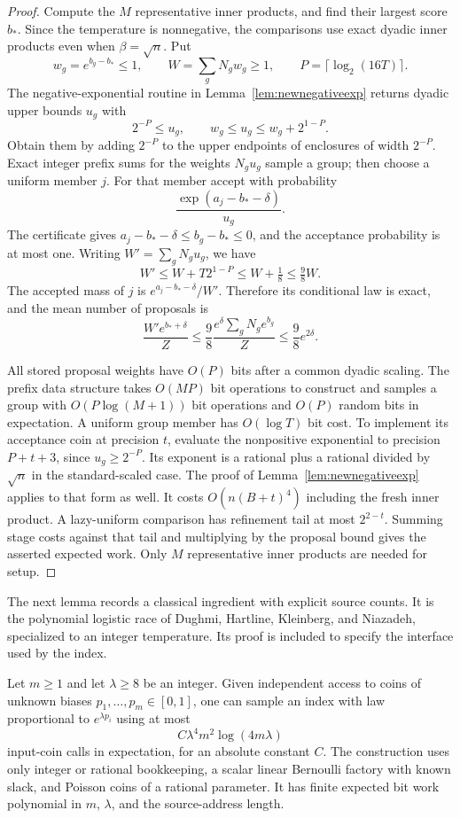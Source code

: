 \begin{proof}
Compute the $M$ representative inner products, and find their
largest score $b_*$. Since the temperature is nonnegative, the
comparisons use exact dyadic inner products even when
$\beta=\sqrt n$. Put
\[
 w_g=e^{b_g-b_*}\le1,\qquad W=\sum_gN_gw_g\ge1,
 \qquad P=\lceil\log_2(16T)\rceil.
\]
The negative-exponential routine in
Lemma~\ref{lem:newnegativeexp} returns dyadic upper bounds $u_g$
with
\[
 2^{-P}\le u_g,\qquad w_g\le u_g\le w_g+2^{1-P}.
\]
Obtain them by adding $2^{-P}$ to the upper endpoints of enclosures
of width $2^{-P}$. Exact integer prefix sums for the weights
$N_gu_g$ sample a group; then choose a uniform member $j$.
For that member accept with probability
\[
 \frac{\exp(a_j-b_*-\delta)}{u_g}.
\]
The certificate gives $a_j-b_*-\delta\le b_g-b_*\le0$, and
the acceptance probability is at most one. Writing
$W'=\sum_gN_gu_g$, we have
\[
 W'\le W+T2^{1-P}\le W+\tfrac18\le\tfrac98W.
\]
The accepted mass of $j$ is $e^{a_j-b_*-\delta}/W'$. Therefore
its conditional law is exact, and the mean number of proposals is
\[
 \frac{W'e^{b_*+\delta}}{Z}
 \le\frac98\frac{e^\delta\sum_gN_ge^{b_g}}Z
 \le\frac98e^{2\delta}.
\]

All stored proposal weights have $O(P)$ bits after a common dyadic
scaling. The prefix data structure takes $O(MP)$ bit operations to
construct and samples a group with $O(P\log(M+1))$ bit operations
and $O(P)$ random bits in expectation. A uniform group member has
$O(\log T)$ bit cost. To implement its acceptance coin at precision
$t$, evaluate the nonpositive exponential to precision $P+t+3$,
since $u_g\ge2^{-P}$. Its exponent is a rational plus a rational
divided by $\sqrt n$ in the standard-scaled case. The proof of
Lemma~\ref{lem:newnegativeexp} applies to that form as well.
It costs $O(n(B+t)^4)$ including the fresh inner product.
A lazy-uniform comparison has refinement tail at most $2^{2-t}$.
Summing stage costs against that tail and multiplying by the
proposal bound gives the asserted expected work. Only
$M$ representative inner products are needed for setup.
\end{proof}

The next lemma records a classical ingredient with explicit source
counts. It is the polynomial logistic race of Dughmi, Hartline,
Kleinberg, and Niazadeh, specialized to an integer temperature.
Its proof is included to specify the interface used by the index.

\begin{lemma}
\label{lem:newpolyrace}
Let $m\ge1$ and let $\lambda\ge8$ be an integer. Given independent
access to coins of unknown biases $p_1,\ldots,p_m\in[0,1]$, one can
sample an index with law proportional to $e^{\lambda p_i}$ using at
most
\[
 C\lambda^4m^2\log(4m\lambda)
\]
input-coin calls in expectation, for an absolute constant $C$.
The construction uses only integer
or rational bookkeeping, a scalar linear Bernoulli factory with
known slack, and Poisson coins of a rational parameter. It has
finite expected bit work polynomial in $m$, $\lambda$, and the
source-address length.
\end{lemma}
